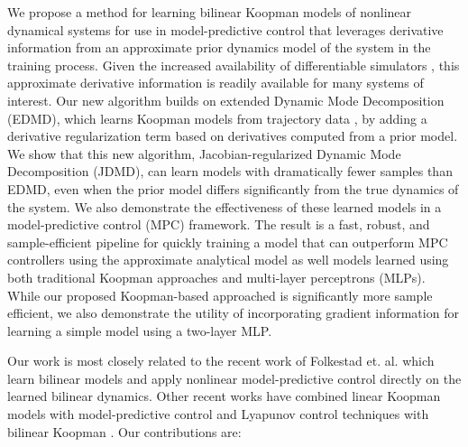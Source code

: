 \documentclass[../root.tex]{subfiles}
\newcommand{\changed}[1]{{\color{black} #1}}
\begin{document}
We propose a method for learning bilinear Koopman models of nonlinear dynamical
systems for use in model-predictive control that leverages \changed{derivative}
information from an approximate prior dynamics model of the system in the
training process.  \changed{Given the increased availability of differentiable
simulators \cite{howell_Dojo_2022,todorov_MuJoCo_2012}, this approximate
derivative information is readily available for many systems of interest.} Our
new algorithm builds on extended Dynamic Mode Decomposition (EDMD), which learns
Koopman models from trajectory data
\cite{meduri_BiConMP_2022,bruder_Advantages_2021,korda_Linear_2018,
folkestad_Episodic_2020,suh_Surprising_2020}, by adding a derivative
regularization term based on derivatives computed from a prior model.  We show
that this new algorithm, Jacobian-regularized Dynamic Mode Decomposition (JDMD),
can learn models with dramatically fewer samples than EDMD, even when the prior
model differs significantly from the true dynamics of the system.  We also
demonstrate the effectiveness of these learned models in a model-predictive
control (MPC) framework.
The result is a fast, robust, and sample-efficient pipeline for quickly training
a model that can outperform \changed{MPC controllers using the approximate
analytical model as well models learned using both traditional Koopman
approaches and multi-layer perceptrons (MLPs).} \changed{While our proposed
Koopman-based approached is significantly more sample efficient, we also
demonstrate the utility of incorporating gradient information for learning a
simple model using a two-layer MLP}.

Our work is most closely related to the recent work of Folkestad et. al.
\cite{folkestad_Koopman_2021,folkestad_Episodic_2020,folkestad_Extended_2020,folkestad_KoopNet_2022}
which learn bilinear models and apply nonlinear model-predictive control
directly on the learned bilinear dynamics. Other recent works have combined
linear Koopman models with model-predictive control \cite{korda_Linear_2018} and
Lyapunov control techniques with bilinear Koopman
\cite{narasingam_Datadriven_2022}. Our contributions are:
\end{document}

